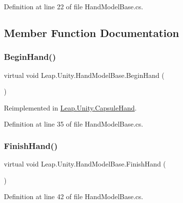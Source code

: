 Definition at line 22 of file Hand\+Model\+Base.\+cs.



\subsection{Member Function Documentation}
\mbox{\label{class_leap_1_1_unity_1_1_hand_model_base_a3b60b707011fa39db35ca3c902167ade}} 
\subsubsection{\texorpdfstring{BeginHand()}{BeginHand()}}
{\footnotesize\ttfamily virtual void Leap.\+Unity.\+Hand\+Model\+Base.\+Begin\+Hand (\begin{DoxyParamCaption}{ }\end{DoxyParamCaption})\hspace{0.3cm}{\ttfamily [virtual]}}



Reimplemented in \mbox{\hyperlink{class_leap_1_1_unity_1_1_capsule_hand_a7d7dc1487d108b421878276cc3747c52}{Leap.\+Unity.\+Capsule\+Hand}}.



Definition at line 35 of file Hand\+Model\+Base.\+cs.

\mbox{\label{class_leap_1_1_unity_1_1_hand_model_base_a042b3778ca6a61c7991d1ffaecdf7eed}} 
\subsubsection{\texorpdfstring{FinishHand()}{FinishHand()}}
{\footnotesize\ttfamily virtual void Leap.\+Unity.\+Hand\+Model\+Base.\+Finish\+Hand (\begin{DoxyParamCaption}{ }\end{DoxyParamCaption})\hspace{0.3cm}{\ttfamily [virtual]}}



Definition at line 42 of file Hand\+Model\+Base.\+cs.


